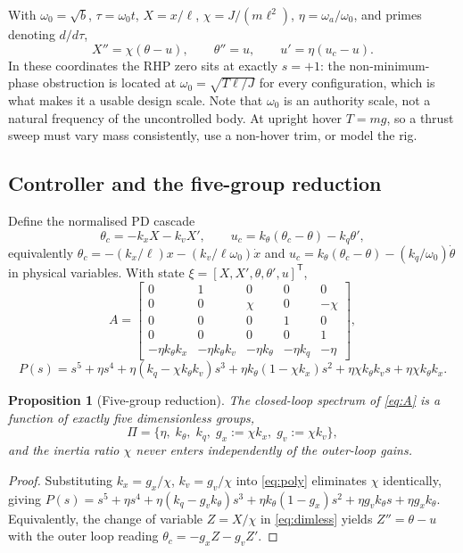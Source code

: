 \documentclass[11pt,a4paper]{article}
\newtheorem{proposition}{Proposition}
\begin{document}
With $\omega_0=\sqrt b$, $\tau=\omega_0 t$, $X=x/\ell$, $\chi=J/(m\ell^2)$, $\eta=\omega_a/\omega_0$,
and primes denoting $d/d\tau$,
\begin{equation}\label{eq:dimless}
X'' = \chi(\theta-u),\qquad \theta''=u,\qquad u'=\eta(u_c-u).
\end{equation}
In these coordinates the RHP zero sits at exactly $s=+1$: the non-minimum-phase obstruction is
located at $\omega_0=\sqrt{T\ell/J}$ for every configuration, which is what makes it a usable design
scale. Note that $\omega_0$ is an authority scale, not a natural frequency of the uncontrolled body.
At upright hover $T=mg$, so a thrust sweep must vary mass consistently, use a non-hover trim, or
model the rig.

\subsection{Controller and the five-group reduction}

Define the normalised PD cascade
\begin{equation}\label{eq:cascade}
\theta_c = -k_x X - k_v X',\qquad u_c = k_\theta(\theta_c-\theta) - k_q\theta',
\end{equation}
equivalently $\theta_c = -(k_x/\ell)x - (k_v/\ell\omega_0)\dot x$ and
$u_c = k_\theta(\theta_c-\theta)-(k_q/\omega_0)\dot\theta$ in physical variables. With state
$\xi=[X,X',\theta,\theta',u]^{\mathsf T}$,
\begin{equation}\label{eq:A}
A=\begin{bmatrix}
0&1&0&0&0\\ 0&0&\chi&0&-\chi\\ 0&0&0&1&0\\ 0&0&0&0&1\\
-\eta k_\theta k_x & -\eta k_\theta k_v & -\eta k_\theta & -\eta k_q & -\eta
\end{bmatrix},
\end{equation}
\begin{equation}\label{eq:poly}
P(s)=s^5+\eta s^4+\eta(k_q-\chi k_\theta k_v)s^3+\eta k_\theta(1-\chi k_x)s^2+\eta\chi k_\theta k_v s+\eta\chi k_\theta k_x.
\end{equation}

\begin{proposition}[Five-group reduction]\label{prop:five}
The closed-loop spectrum of \eqref{eq:A} is a function of exactly five dimensionless groups,
\[
\Pi=\{\eta,\;k_\theta,\;k_q,\;g_x:=\chi k_x,\;g_v:=\chi k_v\},
\]
and the inertia ratio $\chi$ never enters independently of the outer-loop gains.
\end{proposition}
\begin{proof}
Substituting $k_x=g_x/\chi$, $k_v=g_v/\chi$ into \eqref{eq:poly} eliminates $\chi$ identically,
giving $P(s)=s^5+\eta s^4+\eta(k_q-g_v k_\theta)s^3+\eta k_\theta(1-g_x)s^2+\eta g_v k_\theta s+\eta g_x k_\theta$.
Equivalently, the change of variable $Z=X/\chi$ in \eqref{eq:dimless} yields $Z''=\theta-u$ with the
outer loop reading $\theta_c=-g_xZ-g_vZ'$.
\end{proof}
\end{document}
